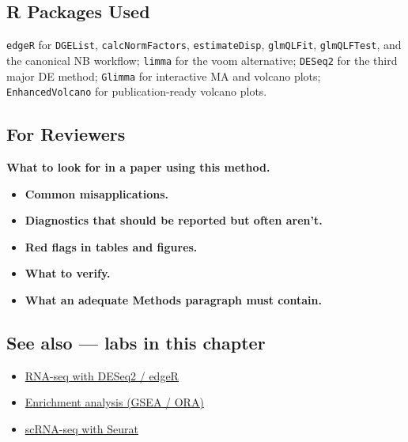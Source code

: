\documentclass[
]{article}
\providecommand{\tightlist}{%
  \setlength{\itemsep}{0pt}\setlength{\parskip}{0pt}}
\begin{document}
\subsection{R Packages Used}\label{r-packages-used}

\texttt{edgeR} for \texttt{DGEList}, \texttt{calcNormFactors},
\texttt{estimateDisp}, \texttt{glmQLFit}, \texttt{glmQLFTest}, and the
canonical NB workflow; \texttt{limma} for the voom alternative;
\texttt{DESeq2} for the third major DE method; \texttt{Glimma} for
interactive MA and volcano plots; \texttt{EnhancedVolcano} for
publication-ready volcano plots.

\subsection{For Reviewers}\label{for-reviewers}

\textbf{What to look for in a paper using this method.}

\begin{itemize}
\tightlist
\item
  \textbf{Common misapplications.}
\item
  \textbf{Diagnostics that should be reported but often aren't.}
\item
  \textbf{Red flags in tables and figures.}
\item
  \textbf{What to verify.}
\item
  \textbf{What an adequate Methods paragraph must contain.}
\end{itemize}

\subsection{See also --- labs in this
chapter}\label{see-also-labs-in-this-chapter}

\begin{itemize}
\tightlist
\item
  \href{labs/lab-rna-seq-with-deseq2-edger.Rmd}{RNA-seq with DESeq2 /
  edgeR}
\item
  \href{labs/lab-enrichment-analysis-gsea-ora.Rmd}{Enrichment analysis
  (GSEA / ORA)}
\item
  \href{labs/lab-scrna-seq-with-seurat.Rmd}{scRNA-seq with Seurat}
\end{itemize}
\end{document}
